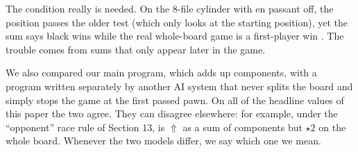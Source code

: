 \indent The condition really is needed. On the 8-file cylinder with en passant off, the position
 passes the older test (which only looks at the starting position), yet the sum
says black wins while the real whole-board game is a first-player win \checkedtwo. The trouble comes from sums
that only appear later in the game.

\indent We also compared our main program, which adds up components, with a program written separately by
another AI system that never splits the board and simply stops the game at the first passed pawn. On all of the
headline values of this paper the two agree. They can disagree elsewhere: for example, under the ``opponent''
race rule of Section 13,  is $\Uparrow$ as a sum of components but $\star2$
on the whole board. Whenever the two models differ, we say which one we mean.
